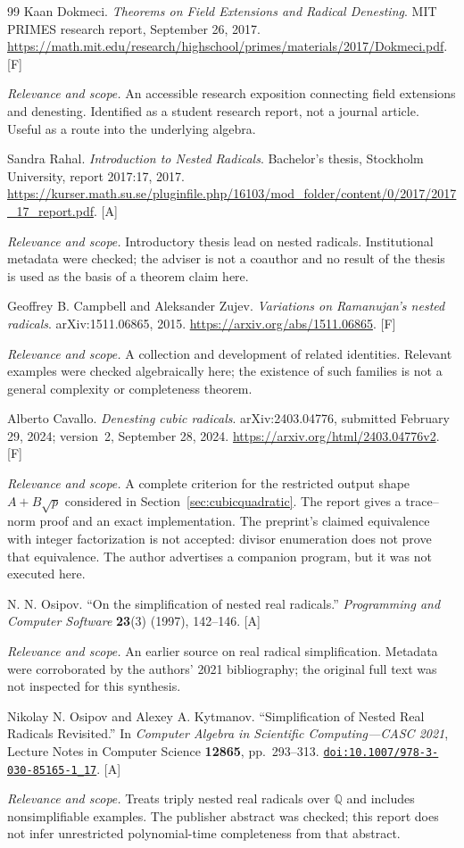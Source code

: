 \documentclass[11pt,oneside]{article}
\numberwithin{equation}{section}
\theoremstyle{definition}
\theoremstyle{remark}
\newcommand{\Q}{\mathbb{Q}}
\newcommand{\doi}[1]{\href{https://doi.org/#1}{\nolinkurl{doi:#1}}}
\newcommand{\status}[1]{\textsf{\small[#1]}}
\newcommand{\entrynote}[1]{\par\smallskip\noindent\emph{Relevance and scope.} #1}
\begin{document}
\begin{thebibliography}{99}
Kaan Dokmeci. \emph{Theorems on Field Extensions and Radical Denesting}. MIT PRIMES research report, September 26, 2017. \url{https://math.mit.edu/research/highschool/primes/materials/2017/Dokmeci.pdf}. \status{F}
\entrynote{An accessible research exposition connecting field extensions and denesting. Identified as a student research report, not a journal article. Useful as a route into the underlying algebra.}

Sandra Rahal. \emph{Introduction to Nested Radicals}. Bachelor's thesis, Stockholm University, report 2017:17, 2017. \url{https://kurser.math.su.se/pluginfile.php/16103/mod_folder/content/0/2017/2017_17_report.pdf}. \status{A}
\entrynote{Introductory thesis lead on nested radicals. Institutional metadata were checked; the adviser is not a coauthor and no result of the thesis is used as the basis of a theorem claim here.}

Geoffrey B. Campbell and Aleksander Zujev. \emph{Variations on Ramanujan's nested radicals}. arXiv:1511.06865, 2015. \url{https://arxiv.org/abs/1511.06865}. \status{F}
\entrynote{A collection and development of related identities. Relevant examples were checked algebraically here; the existence of such families is not a general complexity or completeness theorem.}

Alberto Cavallo. \emph{Denesting cubic radicals}. arXiv:2403.04776, submitted February 29, 2024; version~2, September 28, 2024. \url{https://arxiv.org/html/2403.04776v2}. \status{F}
\entrynote{A complete criterion for the restricted output shape $A+B\sqrt p$ considered in Section~\ref{sec:cubicquadratic}. The report gives a trace--norm proof and an exact implementation. The preprint's claimed equivalence with integer factorization is not accepted: divisor enumeration does not prove that equivalence. The author advertises a companion program, but it was not executed here.}

N. N. Osipov. ``On the simplification of nested real radicals.'' \emph{Programming and Computer Software} \textbf{23}(3) (1997), 142--146. \status{A}
\entrynote{An earlier source on real radical simplification. Metadata were corroborated by the authors' 2021 bibliography; the original full text was not inspected for this synthesis.}

Nikolay N. Osipov and Alexey A. Kytmanov. ``Simplification of Nested Real Radicals Revisited.'' In \emph{Computer Algebra in Scientific Computing---CASC 2021}, Lecture Notes in Computer Science \textbf{12865}, pp.~293--313. \doi{10.1007/978-3-030-85165-1_17}. \status{A}
\entrynote{Treats triply nested real radicals over $\Q$ and includes nonsimplifiable examples. The publisher abstract was checked; this report does not infer unrestricted polynomial-time completeness from that abstract.}


\end{thebibliography}
\end{document}
